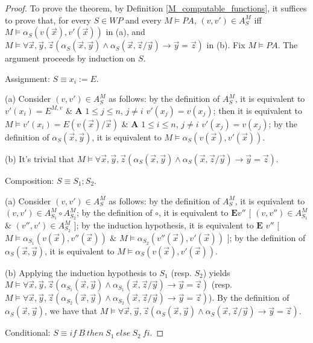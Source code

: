 \documentclass[a4paper,11pt]{article}
\begin{document}
\begin{proof}
To prove the theorem, by Definition \ref{M_computable_functions}, it suffices to prove that, for every $S\in WP$ and every $M\models PA$, $(v,v')\in A_S^M$ iff $M \models \alpha_S(v(\vec{x}),v'(\vec{x}))$ in (a), and $M \models \forall \vec{x},\vec{y},\vec{z}(\alpha_S(\vec{x},\vec{y})\wedge\alpha_S(\vec{x},\vec{z}/\vec{y})\rightarrow \vec{y}=\vec{z})$ in (b). Fix $M\models PA$. The argument proceeds by induction on $S$.

Assignment: $S \equiv x_i := E$.

(a) Consider $(v,v')\in A_S^M$ as follows: by the definition of $A_S^M$, it is equivalent to $v'(x_i) = E^{M,v}$ $\&$ $\textbf{A}$ $1 \leq j\leq n$, $j\neq i$ $v'(x_j) = v(x_j)$; then it is equivalent to $M \models v'(x_i) = E(v(\vec{x})/\vec{x})$ $\&$ $\textbf{A}$ $1\leq i \leq n$, $j\neq i$ $v'(x_j) = v(x_j)$; by the definition of $\alpha_S(\vec{x},\vec{y})$, it is equivalent to $M \models \alpha_S(v(\vec{x}),v'(\vec{x}))$.

(b) It's trivial that $M \models \forall \vec{x},\vec{y},\vec{z}(\alpha_S(\vec{x},\vec{y})\wedge\alpha_S(\vec{x},\vec{z}/\vec{y})\rightarrow \vec{y}=\vec{z})$.

Composition: $S\equiv S_1;S_2$.

(a) Consider $(v,v')\in A_S^M$ as follows: by the definition of $A_S^M$, it is equivalent to $(v,v')\in A_{S_1}^M\circ A_{S_2}^M$; by the definition of $\circ$, it is equivalent to $\textbf{E}v''$ $[$ $(v,v'')\in A_{S_1}^M$ $\&$ $(v'',v')\in A_{S_2}^M$ $]$; by the induction hypothesis, it is equivalent to $\textbf{E}$ $v''$ $[$ $M \models \alpha_{S_1}(v(\vec{x}),v''(\vec{x}))$ $\&$ $M \models \alpha_{S_2}(v''(\vec{x}),v'(\vec{x}))$ $]$; by the definition of $\alpha_S(\vec{x},\vec{y})$, it is equivalent to $M \models \alpha_S(v(\vec{x}),v'(\vec{x}))$.

(b) Applying the induction hypothesis to $S_1$ (resp. $S_2$) yields $M \models \forall \vec{x},\vec{y},\vec{z}(\alpha_{S_1}(\vec{x},\vec{y})\wedge\alpha_{S_1}(\vec{x},\vec{z}/\vec{y})\rightarrow \vec{y}=\vec{z})$ (resp. $M \models \forall \vec{x},\vec{y},\vec{z}(\alpha_{S_2}(\vec{x},\vec{y})\wedge\alpha_{S_2}(\vec{x},\vec{z}/\vec{y})\rightarrow \vec{y}=\vec{z})$). By the definition of $\alpha_S(\vec{x},\vec{y})$, we have that $M \models \forall \vec{x},\vec{y},\vec{z}(\alpha_S(\vec{x},\vec{y})\wedge\alpha_S(\vec{x},\vec{z}/\vec{y})\rightarrow \vec{y}=\vec{z})$.

Conditional: $S\equiv if\ B\ then\ S_1\ else\ S_2\ fi$.


\end{proof}
\end{document}
